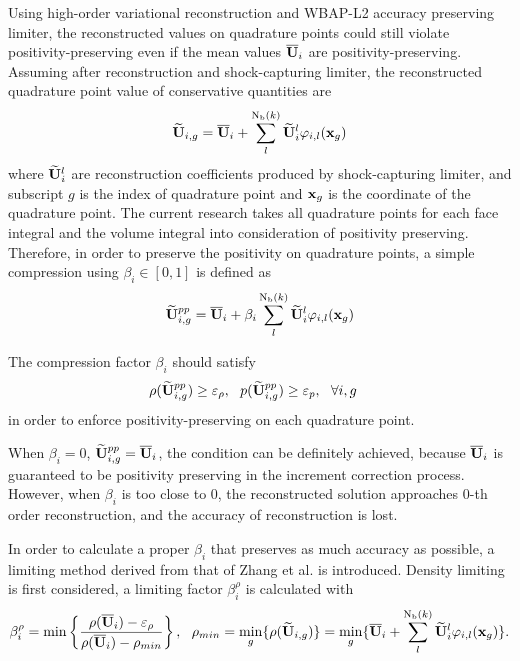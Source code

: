 \label{ssec:rec-pp-limiter}

Using high-order variational reconstruction and WBAP-L2
accuracy preserving limiter, the reconstructed values
on quadrature points could still violate positivity-preserving
even if the mean values $\overline{\mathbf{U}}_i$ are positivity-preserving.
Assuming after reconstruction and shock-capturing limiter,
the reconstructed quadrature point value of conservative quantities are
\begin{equation}
    \widetilde{\mathbf{U}}_{i,g} = \overline{\mathbf{U}}_{i} + \sum_{l}^{\mathrm{N_b}(k)}{\widetilde{\mathbf{U}}_i^l\varphi_{i,l}(\mathbf{x}_g)}
\end{equation}
where $\widetilde{\mathbf{U}}_i^l$ are reconstruction coefficients
produced by shock-capturing limiter,
and subscript $g$ is the index of quadrature point and $\mathbf{x}_g$ is the coordinate of
the quadrature point.
The current research takes all quadrature points for each face integral
and the volume integral into consideration of positivity preserving.
Therefore, in order to preserve the positivity on
quadrature points, a simple compression using $\beta_i\in[0,1]$ is defined as
\begin{equation}
    \widetilde{\mathbf{U}}_{i,g}^{pp} = \overline{\mathbf{U}}_{i} + \beta_i \sum_{l}^{\mathrm{N_b}(k)}{\widetilde{\mathbf{U}}_i^l\varphi_{i,l}(\mathbf{x}_g)}
\end{equation}

The compression factor $\beta_i$ should satisfy
\begin{equation}
    \begin{aligned}
        \rho(\Ulim_{i,g}^{pp}) & \geq \varepsilon_\rho,\ \ p(\Ulim_{i,g}^{pp}) \geq \varepsilon_p ,\ \ \forall i,g
    \end{aligned}
    \label{eq:pointwisePP}
\end{equation}
in order to enforce positivity-preserving on each quadrature point.

When $\beta_i = 0$, $\widetilde{\mathbf{U}}_{i,g}^{pp} = \overline{\mathbf{U}}_{i}$,
the condition  can be definitely achieved,
because $\overline{\mathbf{U}}_{i}$ is guaranteed to be positivity preserving in the increment correction process.
However, when $\beta_i$ is too close to 0, the reconstructed solution
approaches 0-th order reconstruction, and the accuracy of reconstruction is lost.

In order to calculate a proper $\beta_i$ that preserves as much accuracy as possible,
a limiting method derived from
that of Zhang et al. \cite{zhang2010positivity}
is introduced.
Density limiting is first considered,
a limiting factor $\beta_{i}^\rho$ is calculated with
\begin{equation}
    \beta_{i}^\rho = \min\left\{\frac{\rho(\overline{\mathbf{U}}_{i}) - \varepsilon_\rho}{\rho(\overline{\mathbf{U}}_{i}) - \rho_{min}} \right\},\ \
    \rho_{min} = \min_{g}\{\rho(\widetilde{\mathbf{U}}_{i,g})\} =
    \min_{g}\{\overline{\mathbf{U}}_{i} + \sum_{l}^{\mathrm{N_b}(k)}{\widetilde{\mathbf{U}}_i^l\varphi_{i,l}(\mathbf{x}_g)}\}.
\end{equation}

